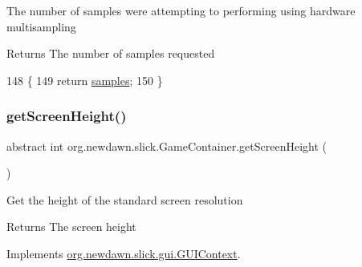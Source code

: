 The number of samples we\textquotesingle{}re attempting to performing using hardware multisampling

\begin{DoxyReturn}{Returns}
The number of samples requested 
\end{DoxyReturn}

\begin{DoxyCode}
148                             \{
149         \textcolor{keywordflow}{return} \mbox{\hyperlink{classorg_1_1newdawn_1_1slick_1_1_game_container_af37ac6c2d7d33d4fac82860184cafff6}{samples}};
150     \}
\end{DoxyCode}
\mbox{\label{classorg_1_1newdawn_1_1slick_1_1_game_container_afdb008e76bcbc6de23e783670c044f28}} 
\subsubsection{\texorpdfstring{get\+Screen\+Height()}{getScreenHeight()}}
{\footnotesize\ttfamily abstract int org.\+newdawn.\+slick.\+Game\+Container.\+get\+Screen\+Height (\begin{DoxyParamCaption}{ }\end{DoxyParamCaption})\hspace{0.3cm}{\ttfamily [abstract]}}

Get the height of the standard screen resolution

\begin{DoxyReturn}{Returns}
The screen height 
\end{DoxyReturn}


Implements \mbox{\hyperlink{interfaceorg_1_1newdawn_1_1slick_1_1gui_1_1_g_u_i_context_ad7b27d047f72ef86c1ec448492a16d6a}{org.\+newdawn.\+slick.\+gui.\+G\+U\+I\+Context}}.

\mbox{\label{classorg_1_1newdawn_1_1slick_1_1_game_container_a4c84d852e74fa2eb0d1e05f924f5402b}} 
